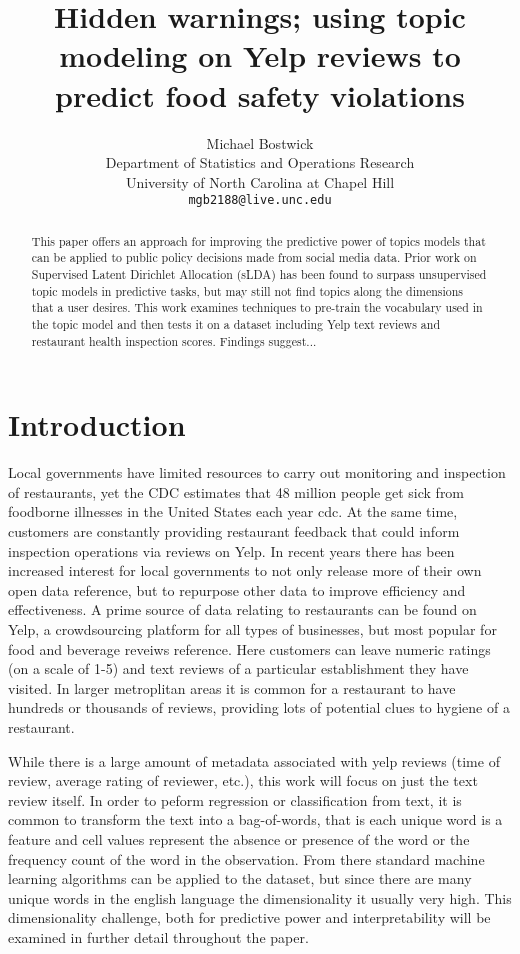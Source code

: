\documentclass{article}
\title{Hidden warnings; using topic modeling on Yelp reviews to predict food safety violations}
\author{
  Michael Bostwick\\
  Department of Statistics and Operations Research\\
  University of North Carolina at Chapel Hill\\
  \texttt{mgb2188@live.unc.edu} \\
}
\begin{document}

\maketitle
\begin{abstract}
  This paper offers an approach for improving the predictive power of topics models that can be applied to public policy decisions made from social media data. Prior work on Supervised Latent Dirichlet Allocation (sLDA) has been found to surpass unsupervised topic models in predictive tasks, but may still not find topics along the dimensions that a user desires. This work examines techniques to pre-train the vocabulary used in the topic model and then tests it on a dataset including Yelp text reviews and restaurant health inspection scores. Findings suggest...
\end{abstract}

\section{Introduction}
Local governments have limited resources to carry out monitoring and inspection of restaurants, yet the CDC estimates that 48 million people get sick from foodborne illnesses in the United States each year {cdc}. At the same time, customers are constantly providing restaurant feedback that could inform inspection operations via reviews on Yelp. In recent years there has been increased interest for local governments to not only release more of their own open data {reference}, but to repurpose other data to improve efficiency and effectiveness. A prime source of data relating to restaurants can be found on Yelp, a crowdsourcing platform for all types of businesses, but most popular for food and beverage reveiws {reference}. Here customers can leave numeric ratings (on a scale of 1-5) and text reviews of a particular establishment they have visited. In larger metroplitan areas it is common for a restaurant to have hundreds or thousands of reviews, providing lots of potential clues to hygiene of a restaurant.

While there is a large amount of metadata associated with yelp reviews (time of review, average rating of reviewer, etc.), this work will focus on just the text review itself. In order to peform regression or classification from text, it is common to transform the text into a bag-of-words, that is each unique word is a feature and cell values represent the absence or presence of the word or the frequency count of the word in the observation. From there standard machine learning algorithms can be applied to the dataset, but since there are many unique words in the english language the dimensionality it usually very high. This dimensionality challenge, both for predictive power and interpretability will be examined in further detail throughout the paper.
\end{document}
